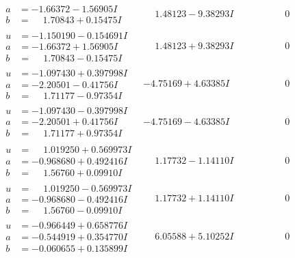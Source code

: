 \documentclass[1p]{elsarticle_modified}
\theoremstyle{definition}
\begin{document}
$$\begin{array}{c|c|c}
\begin{aligned}
a &= -1.66372 - 1.56905 I \\
b &= \phantom{-}1.70843 + 0.15475 I\end{aligned}
 & \phantom{-}1.48123 - 9.38293 I & \phantom{-0.000000 } 0 \\ \hline\begin{aligned}
u &= -1.150190 - 0.154691 I \\
a &= -1.66372 + 1.56905 I \\
b &= \phantom{-}1.70843 - 0.15475 I\end{aligned}
 & \phantom{-}1.48123 + 9.38293 I & \phantom{-0.000000 } 0 \\ \hline\begin{aligned}
u &= -1.097430 + 0.397998 I \\
a &= -2.20501 - 0.41756 I \\
b &= \phantom{-}1.71177 - 0.97354 I\end{aligned}
 & -4.75169 + 4.63385 I & \phantom{-0.000000 } 0 \\ \hline\begin{aligned}
u &= -1.097430 - 0.397998 I \\
a &= -2.20501 + 0.41756 I \\
b &= \phantom{-}1.71177 + 0.97354 I\end{aligned}
 & -4.75169 - 4.63385 I & \phantom{-0.000000 } 0 \\ \hline\begin{aligned}
u &= \phantom{-}1.019250 + 0.569973 I \\
a &= -0.968680 + 0.492416 I \\
b &= \phantom{-}1.56760 + 0.09910 I\end{aligned}
 & \phantom{-}1.17732 - 1.14110 I & \phantom{-0.000000 } 0 \\ \hline\begin{aligned}
u &= \phantom{-}1.019250 - 0.569973 I \\
a &= -0.968680 - 0.492416 I \\
b &= \phantom{-}1.56760 - 0.09910 I\end{aligned}
 & \phantom{-}1.17732 + 1.14110 I & \phantom{-0.000000 } 0 \\ \hline\begin{aligned}
u &= -0.966449 + 0.658776 I \\
a &= -0.544919 + 0.354770 I \\
b &= -0.060655 + 0.135899 I\end{aligned}
 & \phantom{-}6.05588 + 5.10252 I & \phantom{-0.000000 } 0 \\ \hline\begin{aligned}

\end{aligned}
\end{array}$$
\end{document}
